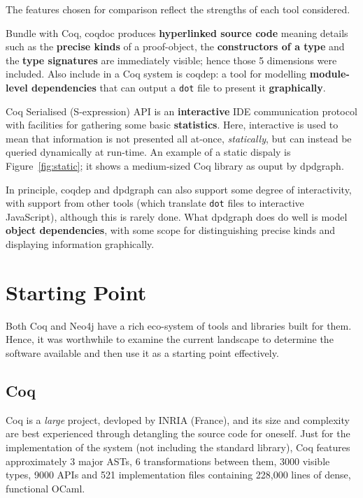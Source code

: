 The features chosen for comparison reflect the strengths of each tool
considered.

Bundle with Coq, coqdoc produces \textbf{hyperlinked source code} meaning
details such as the \textbf{precise kinds} of a proof-object, the
\textbf{constructors of a type} and the \textbf{type signatures} are immediately
visible; hence those 5 dimensions were included.  Also include in a Coq system
is coqdep: a tool for modelling \textbf{module-level dependencies} that can
output a \texttt{dot} file to present it \textbf{graphically}.

Coq Serialised (S-expression) API is an \textbf{interactive} IDE communication
protocol with facilities for gathering some basic \textbf{statistics}. Here,
interactive is used to mean that information is not presented all at-once,
\emph{statically}, but can instead be queried dynamically at run-time. An
example of a static dispaly is Figure~\ref{fig:static}; it shows a medium-sized
Coq library as ouput by dpdgraph.

In principle, coqdep and dpdgraph can also support some degree of interactivity,
with support from other tools (which translate \texttt{dot} files to interactive
JavaScript), although this is rarely done.  What dpdgraph does do well is model
\textbf{object dependencies}, with some scope for distinguishing precise kinds
and displaying information graphically.

\section{Starting Point}

Both Coq and Neo4j have a rich eco-system of tools and libraries built for them.
Hence, it was worthwhile to examine the current landscape to determine the
software available and then use it as a starting point effectively.

\subsection{Coq}

Coq is a \emph{large} project, devloped by INRIA (France), and its size and
complexity are best experienced through detangling the source code for oneself.
Just for the implementation of the system (not including the standard library),
Coq features approximately 3 major ASTs, 6 transformations between them, 3000
visible types, 9000 APIs and 521 implementation files containing 228,000 lines
of dense, functional OCaml.

